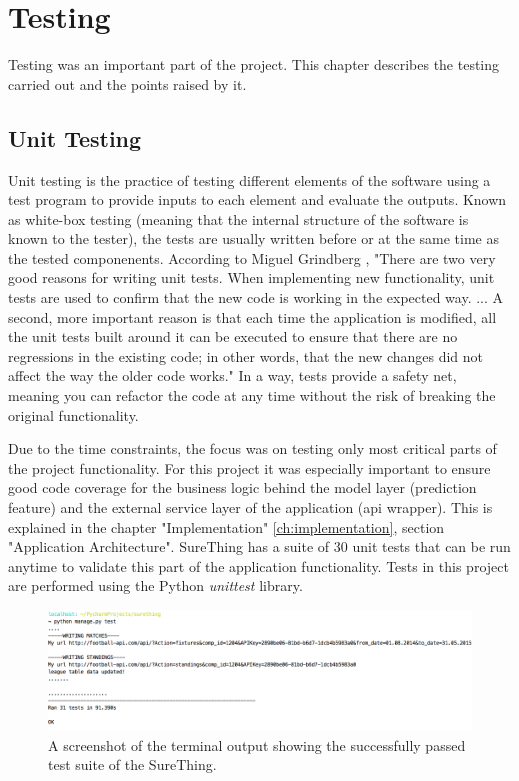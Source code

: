 \chapter{Testing}
\label{ch:testing}
Testing was an important part of the project. This chapter describes the testing carried out and the points raised by it.

\section{Unit Testing}
\label{sec:unittesting_test}
Unit testing is the practice of testing different elements of the software using a test program to provide inputs to each element and evaluate the outputs.
Known as white-box testing (meaning that the internal structure of the software is known to the tester), the tests are usually written before or at the same time as the tested componenents. According to Miguel Grindberg \citep{book:Grindberg2014FlaskWebDevelopment}, "There are two very good reasons for writing unit tests. When implementing new functionality, unit tests are used to confirm that the new code is working in the expected way. ... A second, more important reason is that each time the application is modified, all the unit tests built around it can be executed to ensure that there are no regressions  in the existing code; in other words, that the new changes did not affect the way the older code works." In a way, tests provide a safety net, meaning you can refactor the code at any time without the risk of breaking the original functionality.

Due to the time constraints, the focus was on testing only most critical parts of the project functionality. For this project it was especially important to ensure good code coverage for the business logic behind the model layer (prediction feature) and the external service layer of the application (api wrapper). This is explained in the chapter "Implementation" \ref{ch:implementation}, section "Application Architecture". SureThing has a suite of 30 unit tests that can be run anytime to validate this part of the application functionality. Tests in this project are performed using the Python \emph{unittest} library.

\begin{figure}[H]
	\begin{center}
		\includegraphics[width=.90\textwidth]{testing/images/unittestsOk}
		\caption{A screenshot of the terminal output showing the successfully passed test suite of the SureThing.}
		\label{fig:using:unitttestsok}
\end{center}
\end{figure}

